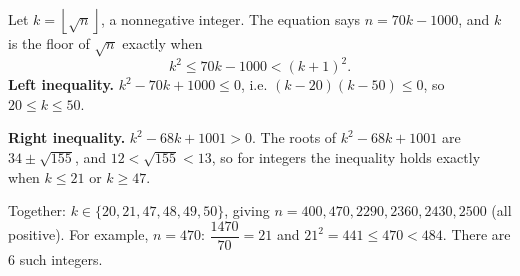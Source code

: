 Let $k=\left\lfloor\sqrt n\right\rfloor$, a nonnegative integer. The equation says $n=70k-1000$, and $k$ is the floor of $\sqrt n$ exactly when
\[k^2\le70k-1000<(k+1)^2.\]
\textbf{Left inequality.} $k^2-70k+1000\le0$, i.e. $(k-20)(k-50)\le0$, so $20\le k\le50$.

\textbf{Right inequality.} $k^2-68k+1001>0$. The roots of $k^2-68k+1001$ are $34\pm\sqrt{155}$, and $12<\sqrt{155}<13$, so for integers the inequality holds exactly when $k\le21$ or $k\ge47$.

Together: $k\in\{20,21,47,48,49,50\}$, giving $n=400,470,2290,2360,2430,2500$ (all positive). For example, $n=470$: $\dfrac{1470}{70}=21$ and $21^2=441\le470<484$. There are $\boxed{6}$ such integers.
